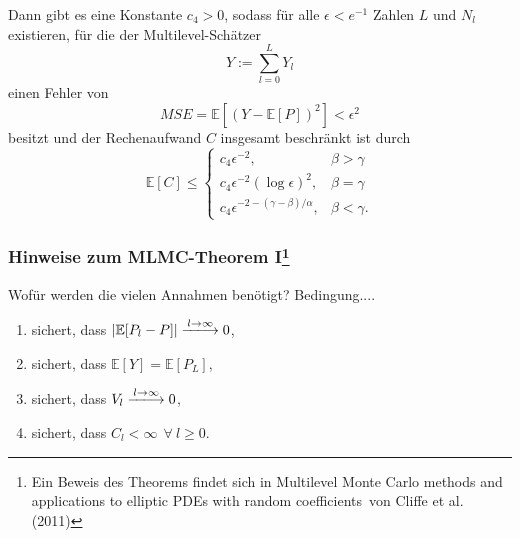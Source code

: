 \begin{frame}
	\begin{theorem}
		Dann gibt es eine Konstante $c_4>0$, sodass für alle $\epsilon<e^{-1}$ Zahlen $L$ und $N_l$ existieren, für die der Multilevel-Schätzer
		\[
			Y:=\sum\limits_{l=0}^L Y_l
		\]
		einen Fehler von
		\[
			MSE=\mathbb{E}\left[(Y-\mathbb{E}[P])^2\right]<\epsilon^2
		\]
		besitzt und der Rechenaufwand $C$ insgesamt beschränkt ist durch
		\[
			\mathbb{E}[C]\leq\begin{cases}c_4\epsilon^{-2}, & \beta>\gamma \\ c_4\epsilon^{-2}(\log\epsilon)^2, & \beta=\gamma \\ c_4\epsilon^{-2-(\gamma-\beta)/\alpha}, & \beta<\gamma.\end{cases}
		\]
	\end{theorem}
\end{frame}

\begin{frame}[c]
	\frametitle{Hinweise zum MLMC-Theorem I\footnote{Ein Beweis des Theorems findet sich in \glqq Multilevel Monte Carlo methods and applications to elliptic PDEs with random coefficients\grqq\ von Cliffe et al. (2011)}}
	Wofür werden die vielen Annahmen benötigt?
	\newline
	\newline
	Bedingung....
	\begin{enumerate}
		\item sichert, dass $|\mathbb{E}[P_l-P]|\xlongrightarrow{l\to\infty}0$,
		\item sichert, dass $\mathbb{E}[Y]=\mathbb{E}[P_L]$,
		\item sichert, dass $V_l\xlongrightarrow{l\to\infty}0$,
		\item sichert, dass $C_l<\infty\ \ \forall\ l\geq 0$.
	\end{enumerate}
\end{frame}

